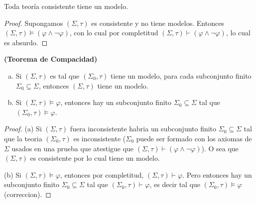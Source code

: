 
  \begin{corollary} \label{corollary_83}
    \PN Toda teoría consistente tiene un modelo.
  \end{corollary}
  \begin{proof}
    Supongamos $(\Sigma, \tau)$ es consistente y no tiene modelos. Entonces $ (\Sigma, \tau)\models \left( \varphi
    \wedge \lnot \varphi \right) $, con lo cual por completitud $(\Sigma, \tau)\vdash \left( \varphi \wedge \lnot
    \varphi \right) $, lo cual es absurdo.
  \end{proof}

  \begin{corollary} \label{corollary_84}
    \PN \textbf{(Teorema de Compacidad)}
    \begin{enumerate}[(a)]
      \item Si $(\Sigma, \tau)$ es tal que $(\Sigma_{0}, \tau)$ tiene un modelo, para cada subconjunto finito
      $\Sigma_{0} \subseteq \Sigma$, entonces $(\Sigma, \tau)$ tiene un modelo.
      \item Si $(\Sigma, \tau) \models \varphi$, entonces hay un subconjunto finito $\Sigma_{0} \subseteq \Sigma$ tal
      que $(\Sigma_{0}, \tau) \models \varphi$.
    \end{enumerate}
  \end{corollary}
  \begin{proof}
    (a) Si $(\Sigma, \tau)$ fuera inconsistente habria un subconjunto finito $ \Sigma _{0}\subseteq \Sigma $ tal que la teoria $(\Sigma _{0},\tau )$ es inconsistente ($\Sigma _{0}$ puede ser formado con los axiomas de $\Sigma $ usados en una prueba que atestigue que $(\Sigma, \tau)\vdash \left( \varphi \wedge \lnot \varphi \right) $). O sea que $(\Sigma, \tau)$ es consistente por lo cual tiene un modelo.

    (b) Si $(\Sigma, \tau)\models \varphi $, entonces por completitud, $(\Sigma, \tau)\vdash \varphi $. Pero entonces hay un subconjunto finito $\Sigma _{0}\subseteq \Sigma $ tal que $(\Sigma _{0},\tau )\vdash \varphi $, es decir tal que $(\Sigma _{0},\tau )\models \varphi $ (correccion).
  \end{proof}

